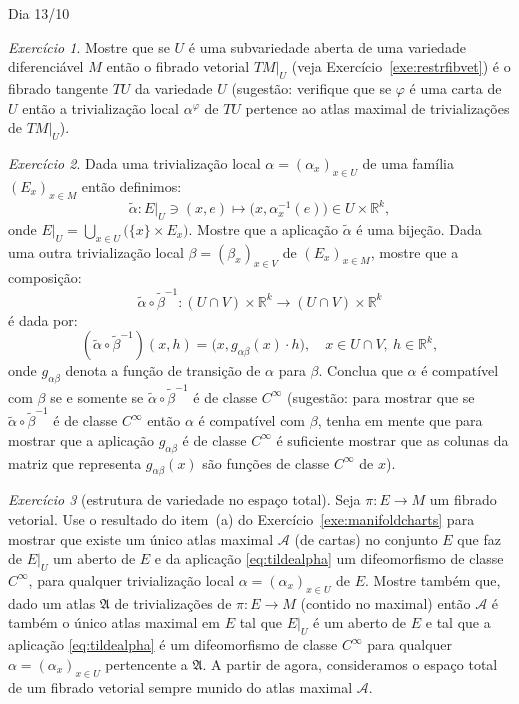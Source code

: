 \documentclass[oneside,11pt]{amsart}
\newcommand{\R}{\mathds R}
\theoremstyle{remark}\newtheorem{exercise}{Exercício}[section]
\theoremstyle{plain}\newtheorem{teo}{Teorema}[section]
\theoremstyle{plain}\newtheorem{lem}[teo]{Lema}
\theoremstyle{plain}\newtheorem{prop}[teo]{Proposição}
\theoremstyle{definition}\newtheorem{defin}[teo]{Definição}
\theoremstyle{remark}\newtheorem{rem}[teo]{Observação}
\theoremstyle{definition}\newtheorem{example}[teo]{Exemplo}
\numberwithin{equation}{section}
\begin{document}
\begin{section}{Dia 13/10}
\begin{exercise}
Mostre que se $U$ é uma subvariedade aberta de uma variedade diferenciável $M$ então o fibrado vetorial $TM\vert_U$ (veja
Exercício~\ref{exe:restrfibvet}) é o fibrado tangente $TU$ da variedade $U$ (sugestão: verifique que se $\varphi$ é uma carta de $U$ então a trivialização local
$\alpha^\varphi$ de $TU$ pertence ao atlas maximal de trivializações de $TM\vert_U$).
\end{exercise}

\begin{exercise}
Dada uma trivialização local $\alpha=(\alpha_x)_{x\in U}$ de uma família $(E_x)_{x\in M}$ então definimos:
\begin{equation}\label{eq:tildealpha}
\tilde\alpha:E\vert_U\ni(x,e)\longmapsto\big(x,\alpha_x^{-1}(e)\big)\in U\times\R^k,
\end{equation}
onde $E\vert_U=\bigcup_{x\in U}\big(\{x\}\times E_x\big)$. Mostre que a aplicação $\tilde\alpha$ é uma bijeção. Dada uma outra trivialização
local $\beta=(\beta_x)_{x\in V}$ de $(E_x)_{x\in M}$, mostre que a composição:
\[\tilde\alpha\circ\tilde\beta^{-1}:(U\cap V)\times\R^k\longrightarrow(U\cap V)\times\R^k\]
é dada por:
\[(\tilde\alpha\circ\tilde\beta^{-1})(x,h)=\big(x,g_{\alpha\beta}(x)\cdot h\big),\quad x\in U\cap V,\ h\in\R^k,\]
onde $g_{\alpha\beta}$ denota a função de transição de $\alpha$ para $\beta$.
Conclua que $\alpha$ é compatível com $\beta$ se e somente se $\tilde\alpha\circ\tilde\beta^{-1}$ é de classe $C^\infty$ (sugestão:
para mostrar que se $\tilde\alpha\circ\tilde\beta^{-1}$ é de classe $C^\infty$ então $\alpha$ é compatível com $\beta$, tenha em mente que
para mostrar que a aplicação $g_{\alpha\beta}$ é de classe $C^\infty$ é suficiente mostrar que as colunas da matriz que representa $g_{\alpha\beta}(x)$
são funções de classe $C^\infty$ de $x$).
\end{exercise}

\begin{exercise}[estrutura de variedade no espaço total]\label{exe:espacototal}
Seja $\pi:E\to M$ um fibrado vetorial. Use o resultado do item~(a) do Exercício~\ref{exe:manifoldcharts} para mostrar que existe um único atlas maximal $\mathcal A$ (de cartas)
no conjunto $E$ que faz de $E\vert_U$ um aberto de $E$ e da aplicação \eqref{eq:tildealpha} um difeomorfismo de classe $C^\infty$, para qualquer
trivialização local $\alpha=(\alpha_x)_{x\in U}$ de $E$. Mostre também que, dado um atlas $\mathfrak A$ de trivializações de $\pi:E\to M$ (contido no maximal)
então $\mathcal A$ é também o único atlas maximal em $E$ tal que $E\vert_U$ é um aberto de $E$ e tal que a aplicação \eqref{eq:tildealpha} é um difeomorfismo de classe
$C^\infty$ para qualquer $\alpha=(\alpha_x)_{x\in U}$ pertencente a $\mathfrak A$.
A partir de agora, consideramos o espaço total de um fibrado vetorial sempre munido do atlas maximal $\mathcal A$.
\end{exercise}


\end{section}
\end{document}
